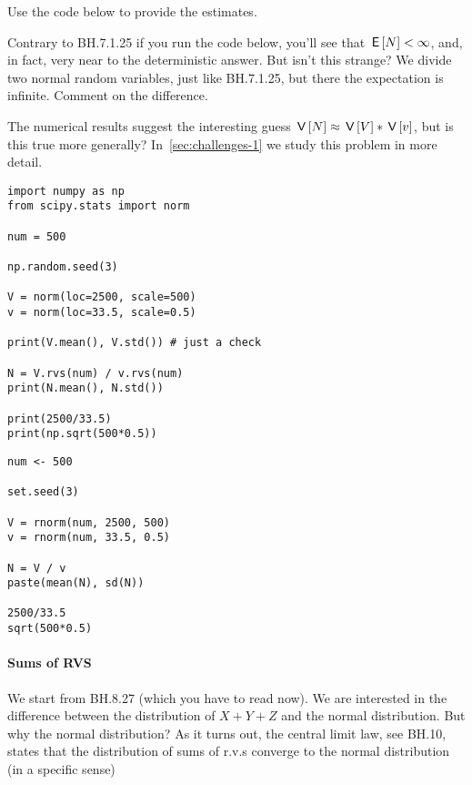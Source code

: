 \documentclass[assignments]{subfiles}
\begin{document}
\begin{exercise}
Use the code below to provide the estimates.
\begin{solution}
\end{solution}
\end{exercise}

\begin{exercise}
Contrary to BH.7.1.25 if you run the code below, you'll see that $\,\mathsf{E}\left[N\right] < \infty$, and, in fact, very near to the deterministic answer.
But isn't this strange?
We divide two normal random variables, just like BH.7.1.25, but there the expectation is infinite.
Comment on the difference.
\begin{solution}
\end{solution}
\end{exercise}


The numerical results suggest the interesting guess $\,\mathsf{V}\left[N\right] \approx \,\mathsf{V}\left[V\right] * \,\mathsf{V}\left[v\right]$, but is this true more generally?
In~\cref{sec:challenges-1} we study this problem in more detail.

\begin{verbatim}
import numpy as np
from scipy.stats import norm

num = 500

np.random.seed(3)

V = norm(loc=2500, scale=500)
v = norm(loc=33.5, scale=0.5)

print(V.mean(), V.std()) # just a check

N = V.rvs(num) / v.rvs(num)
print(N.mean(), N.std())

print(2500/33.5)
print(np.sqrt(500*0.5))
\end{verbatim}

\begin{verbatim}
num <- 500

set.seed(3)

V = rnorm(num, 2500, 500)
v = rnorm(num, 33.5, 0.5)

N = V / v
paste(mean(N), sd(N))

2500/33.5
sqrt(500*0.5)
\end{verbatim}



\paragraph{Sums of RVS}

We start from BH.8.27 (which you have to read now).  We are interested in the difference between the distribution of $X+Y+Z$ and the normal distribution. But why the normal distribution? As it turns out, the central limit law, see BH.10, states that the distribution of sums of r.v.s converge to the normal distribution (in a specific sense)
\end{document}
